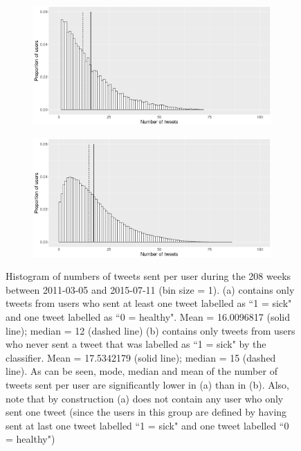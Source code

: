 \documentclass[11pt, a4paper]{report}\usepackage[]{graphicx}\usepackage[]{color}
\begin{document}
\begin{figure}[h]
\centering
  \begin{subfigure}[b]{1\textwidth}
  \includegraphics[width=1\linewidth]{user_activity_both_sick_raw_df.png}
  \caption{}
  \end{subfigure}
  \begin{subfigure}[b]{1\textwidth}
  \includegraphics[width=1\linewidth]{user_activity_only_healthy_sick_raw_df.png}
  \caption{}
  \end{subfigure}
  \caption{Histogram of numbers of tweets sent per user during the 208 weeks between 2011-03-05 and 2015-07-11 (bin size = 1). (a) contains only tweets from users who sent at least one tweet labelled as ``1 = sick" and one tweet labelled as ``0 = healthy".  Mean = 16.0096817 (solid line); median = 12 (dashed line) (b) contains only tweets from users who never sent a tweet that was labelled as ``1 = sick" by the classifier.  Mean = 17.5342179 (solid line); median = 15 (dashed line). As can be seen, mode, median and mean of the number of tweets sent per user are significantly lower in (a) than in (b). Also, note that by construction (a) does not contain any user who only sent one tweet (since the users in this group are defined by having sent at last one tweet labelled ``1 = sick" and one tweet labelled ``0 = healthy")}
  \label{fig:both_vs_healthy_only_hist}

\end{figure}
\end{document}
